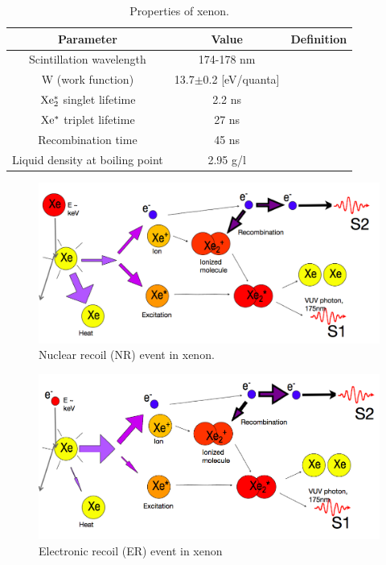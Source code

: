 \begin{table}[h!]
\begin{center}
\begin{tabular}{|c|c|c|}
\hline
Parameter & Value & Definition\\ \hline
Scintillation wavelength		& 174-178 nm 		&  \cite{Doke_Scintillation} \\ \hline
W (work function)				& 13.7$\pm$0.2 [eV/quanta]	&  \cite{Dahl_Thesis} \\ \hline
$\rm Xe^*_2$	singlet lifetime	& 2.2 ns			& \cite{Xe_singlet_tripplet_lifetime}\\ \hline
$\rm Xe^* $ triplet lifetime 	& 27 ns			&  \cite{Xe_singlet_tripplet_lifetime} \\ \hline
Recombination time 			& 45 ns			 & \cite{Xe_Recombination_Time}\\ \hline
Liquid density at boiling point	& 2.95 g/l 			& \cite{Xe_Density} \\ \hline
\end{tabular}
\caption{Properties of xenon.}
\label{table:Xe_Properties}
\end{center}
\end{table}

\renewcommand{\baselinestretch}{2}
\small\normalsize


 \begin{figure}[h!]\centering
 \includegraphics[width=150mm]{Chapter_LUX_Det/NR_T_Shutt.png}
\caption{Nuclear recoil (NR) event in xenon.}
\label{fig:TomS_ER}
\end{figure}

 \begin{figure}[h!]\centering
\includegraphics[width=150mm]{Chapter_LUX_Det/ER_T_Shutt.png}
\caption{Electronic recoil (ER) event in xenon}
\label{fig:TomS_NR}
\end{figure}

